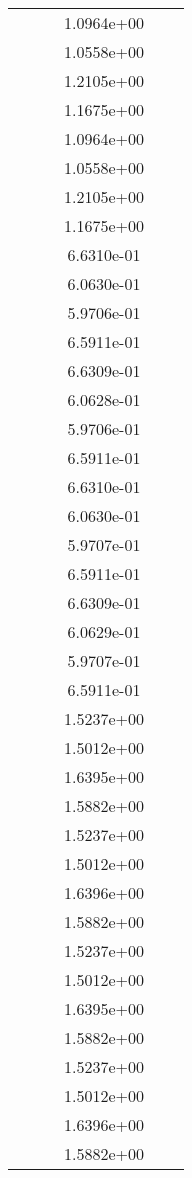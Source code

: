 \begin{xltabular}{\textwidth}{r|rS[table-format=1.3e+2]S[table-format=1.4e+2]S[table-format=1.4e+2]S[table-format=-1.5]}
&  &  & 1.0964e+00 & & \\
&  &  & 1.0558e+00 & & \\
&  &  & 1.2105e+00 & & \\
&  &  & 1.1675e+00 & & \\
&  &  & 1.0964e+00 & & \\
&  &  & 1.0558e+00 & & \\
&  &  & 1.2105e+00 & & \\
&  &  & 1.1675e+00 & & \\
&  &  & 6.6310e-01 & & \\
&  &  & 6.0630e-01 & & \\
&  &  & 5.9706e-01 & & \\
&  &  & 6.5911e-01 & & \\
&  &  & 6.6309e-01 & & \\
&  &  & 6.0628e-01 & & \\
&  &  & 5.9706e-01 & & \\
&  &  & 6.5911e-01 & & \\
&  &  & 6.6310e-01 & & \\
&  &  & 6.0630e-01 & & \\
&  &  & 5.9707e-01 & & \\
&  &  & 6.5911e-01 & & \\
&  &  & 6.6309e-01 & & \\
&  &  & 6.0629e-01 & & \\
&  &  & 5.9707e-01 & & \\
&  &  & 6.5911e-01 & & \\
&  &  & 1.5237e+00 & & \\
&  &  & 1.5012e+00 & & \\
&  &  & 1.6395e+00 & & \\
&  &  & 1.5882e+00 & & \\
&  &  & 1.5237e+00 & & \\
&  &  & 1.5012e+00 & & \\
&  &  & 1.6396e+00 & & \\
&  &  & 1.5882e+00 & & \\
&  &  & 1.5237e+00 & & \\
&  &  & 1.5012e+00 & & \\
&  &  & 1.6395e+00 & & \\
&  &  & 1.5882e+00 & & \\
&  &  & 1.5237e+00 & & \\
&  &  & 1.5012e+00 & & \\
&  &  & 1.6396e+00 & & \\
&  &  & 1.5882e+00 & & \\

\end{xltabular}
